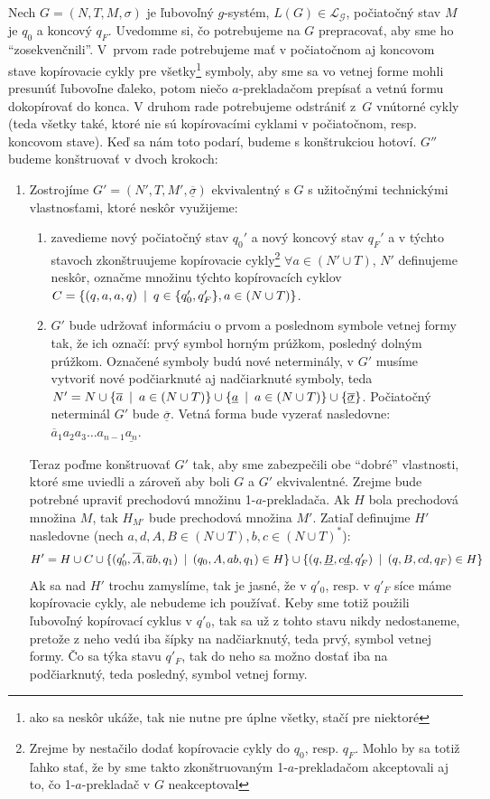 \begin{dokaz}
Nech $G=(N,T,M,\sigma)$ je ľubovoľný $g$-systém,
$L(G)\in\mathcal{L_G}$, počiatočný stav $M$ je $q_0$ a koncový
$q_F$. Uvedomme si, čo potrebujeme na $G$ prepracovať, aby sme ho
``zosekvenčnili''. \mbox{V prvom} rade potrebujeme mať v
po\-čia\-toč\-nom aj koncovom stave kopírovacie cykly pre
všetky\footnote{ako sa neskôr ukáže, tak nie nutne pre úplne
všetky, stačí pre niektoré} symboly, aby sme sa vo vetnej forme
mohli presunúť ľubovoľne ďaleko, potom niečo $a$-prek\-la\-da\-čom
prepísať a vetnú formu dokopírovať do konca. V druhom rade
potrebujeme odstrániť \mbox{z $G$} vnútorné cykly (teda všetky
také, ktoré nie sú kopírovacími cyklami v počiatočnom,
\mbox{resp.} koncovom stave). Keď sa nám toto podarí, budeme s
konštrukciou hotoví. $G''$ budeme konštruovať v dvoch krokoch:
\begin{enumerate}
  \item Zostrojíme $G'=(N',T,M',\underline{\overline{\sigma}})$
  ekvivalentný s $G$ s užitočnými technickými vlastnosťami, ktoré
  neskôr využijeme:
  \begin{enumerate}
    \item zavedieme nový počiatočný stav $q_0'$ a nový koncový stav
    $q_F'$ a v týchto stavoch zkonštruujeme kopírovacie
    cykly\footnote{Zrejme by nestačilo dodať kopírovacie cykly do
    $q_0$, resp. $q_F$. Mohlo by sa totiž ľahko stať, že by sme takto
    zkonštruovaným 1-$a$-prekladačom akceptovali aj to, čo
    1-$a$-prekladač v $G$ neakceptoval} $\forall a\in(N'\cup T)$, $N'$
    definujeme neskôr, označme množinu týchto kopírovacích cyklov
    $C=\{(q,a,a,q)\enspace |\enspace q\in\{q'_0,q'_F\},a\in(N\cup T)\}$.
    \item $G'$ bude udržovať informáciu o prvom  a poslednom symbole
    vetnej formy tak, že ich označí: prvý symbol horným prúžkom,
    posledný dolným prúžkom. Označené symboly budú nové neterminály, v
    $G'$ musíme vytvoriť nové podčiarknuté aj nadčiarknuté symboly,
    teda $N'=N\cup\{\overline{a}\enspace |\enspace a\in(N\cup T
    )\}\cup\{\underline{a}\enspace |\enspace a\in(N\cup
    T)\}\cup\{\underline{\overline{\sigma}}\}$. Počiatočný neterminál
    $G'$ bude $\underline{\overline{\sigma}}$. Vetná forma bude
    vyzerať nasledovne: $\overline{a}_1 a_2 a_3\dots
    a_{n-1}\underline{a_n}$.
  \end{enumerate}
  Teraz poďme konštruovať $G'$ tak, aby sme zabezpečili obe
  ``dobré'' vlastnosti, ktoré sme uviedli a zároveň aby boli $G$ a
  $G'$ ekvivalentné. Zrejme bude potrebné upraviť prechodovú množinu
  1-$a$-prekladača. Ak $H$ bola prechodová množina $M$, tak $H_{M'}$
  bude prechodová množina $M'$. Zatiaľ definujme $H'$ nasledovne
  (nech $a,d,A,B\in(N\cup T),b,c\in(N\cup T)^*$):
  \[
  H'=H\cup C\cup\{(q'_0,\overline{A},\overline{a}b,q_1)\enspace |\enspace
  (q_0,A,ab,q_1)\in H\}\cup \{(q,\underline{B},c
  \underline{d},q'_F)\enspace |\enspace(q,B,cd,q_F)\in H\}
  \]
  Ak sa nad $H'$ trochu zamyslíme, tak je jasné, že v $q'_0$, resp.
  v $q'_F$ síce máme kopírovacie cykly, ale nebudeme ich používať.
  Keby sme totiž použili ľubovoľný kopírovací cyklus v $q'_0$, tak
  sa už z tohto stavu nikdy nedostaneme, pretože z neho vedú iba
  šípky na nadčiarknutý, teda prvý, symbol vetnej formy. Čo sa týka
  stavu $q'_F$, tak do neho sa možno dostať iba na podčiarknutý,
  teda posledný, symbol vetnej formy.


\end{enumerate}
\end{dokaz}
